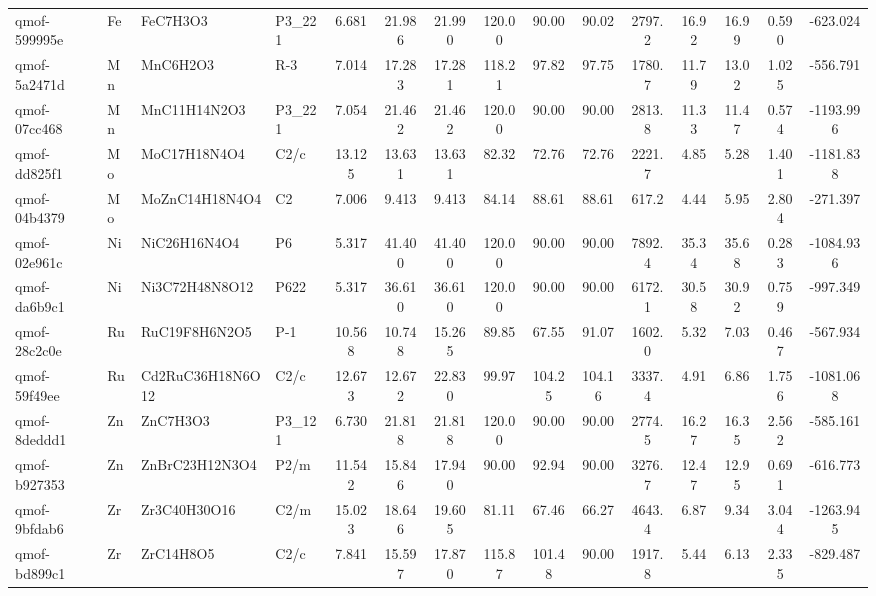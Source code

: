 {\begin{longtable}{llllccccccccccc}
qmof-599995e & Fe & FeC7H3O3 & P3\_221 & 6.681 & 21.986 & 21.990 & 120.00 & 90.00 & 90.02 & 2797.2 & 16.92 & 16.99 & 0.590 & -623.024 \\
qmof-5a2471d & Mn & MnC6H2O3 & R-3 & 7.014 & 17.283 & 17.281 & 118.21 & 97.82 & 97.75 & 1780.7 & 11.79 & 13.02 & 1.025 & -556.791 \\
qmof-07cc468 & Mn & MnC11H14N2O3 & P3\_221 & 7.054 & 21.462 & 21.462 & 120.00 & 90.00 & 90.00 & 2813.8 & 11.33 & 11.47 & 0.574 & -1193.996 \\
qmof-dd825f1 & Mo & MoC17H18N4O4 & C2/c & 13.125 & 13.631 & 13.631 & 82.32 & 72.76 & 72.76 & 2221.7 & 4.85 & 5.28 & 1.401 & -1181.838 \\
qmof-04b4379 & Mo & MoZnC14H18N4O4 & C2 & 7.006 & 9.413 & 9.413 & 84.14 & 88.61 & 88.61 & 617.2 & 4.44 & 5.95 & 2.804 & -271.397 \\
qmof-02e961c & Ni & NiC26H16N4O4 & P6 & 5.317 & 41.400 & 41.400 & 120.00 & 90.00 & 90.00 & 7892.4 & 35.34 & 35.68 & 0.283 & -1084.936 \\
qmof-da6b9c1 & Ni & Ni3C72H48N8O12 & P622 & 5.317 & 36.610 & 36.610 & 120.00 & 90.00 & 90.00 & 6172.1 & 30.58 & 30.92 & 0.759 & -997.349 \\
qmof-28c2c0e & Ru & RuC19F8H6N2O5 & P-1 & 10.568 & 10.748 & 15.265 & 89.85 & 67.55 & 91.07 & 1602.0 & 5.32 & 7.03 & 0.467 & -567.934 \\
qmof-59f49ee & Ru & Cd2RuC36H18N6O12 & C2/c & 12.673 & 12.672 & 22.830 & 99.97 & 104.25 & 104.16 & 3337.4 & 4.91 & 6.86 & 1.756 & -1081.068 \\
qmof-8deddd1 & Zn & ZnC7H3O3 & P3\_121 & 6.730 & 21.818 & 21.818 & 120.00 & 90.00 & 90.00 & 2774.5 & 16.27 & 16.35 & 2.562 & -585.161 \\
qmof-b927353 & Zn & ZnBrC23H12N3O4 & P2/m & 11.542 & 15.846 & 17.940 & 90.00 & 92.94 & 90.00 & 3276.7 & 12.47 & 12.95 & 0.691 & -616.773 \\
qmof-9bfdab6 & Zr & Zr3C40H30O16 & C2/m & 15.023 & 18.646 & 19.605 & 81.11 & 67.46 & 66.27 & 4643.4 & 6.87 & 9.34 & 3.044 & -1263.945 \\
qmof-bd899c1 & Zr & ZrC14H8O5 & C2/c & 7.841 & 15.597 & 17.870 & 115.87 & 101.48 & 90.00 & 1917.8 & 5.44 & 6.13 & 2.335 & -829.487 \\
\end{longtable}
}
